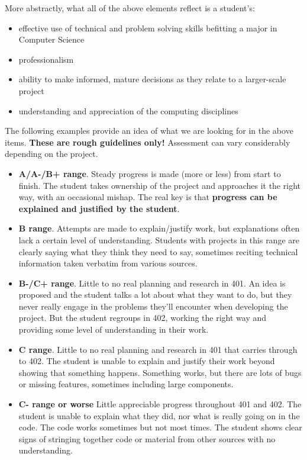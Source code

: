 \documentclass[10pt]{article}
\begin{document}
More abstractly, what all of the above elements reflect is a student's:
\begin{itemize}
\item effective use of technical and problem solving skills befitting a major in Computer Science
\item professionalism
\item ability to make informed, mature decisions as they relate to a larger-scale project
\item understanding and appreciation of the computing disciplines
\end{itemize}

The following examples provide an idea of what we are looking for in
the above items. \textbf{These are rough guidelines only!} Assessment
can vary considerably depending on the project.

\begin{itemize}
\item \textbf{A/A-/B+ range}. Steady progress is made (more or less)
  from start to finish. The student takes ownership of the project and
  approaches it the right way, with an occasional mishap. The real key
  is that \textbf{progress can be explained and justified by the
    student}.
\item \textbf{B range}. Attempts are made to explain/justify work, but
  explanations often lack a certain level of understanding. Students
  with projects in this range are clearly saying what they think they
  need to say, sometimes reciting technical information taken verbatim
  from various sources.
\item \textbf{B-/C+ range}. Little to no real planning and research in
  401. An idea is proposed and the student talks a lot about what they
  want to do, but they never really engage in the problems they'll
  encounter when developing the project. But the student regroups in
  402, working the right way and providing some level of understanding
  in their work.
\item \textbf{C range}. Little to no real planning and research in 401
  that carries through to 402. The student is unable to explain and
  justify their work beyond showing that something happens. Something
  works, but there are lots of bugs or missing features, sometimes
  including large components.
\item \textbf{C- range or worse} Little appreciable progress
  throughout 401 and 402. The student is unable to explain what they
  did, nor what is really going on in the code. The code works
  sometimes but not most times. The student shows clear signs of
  stringing together code or material from other sources with no
  understanding.
\end{itemize}
\end{document}
